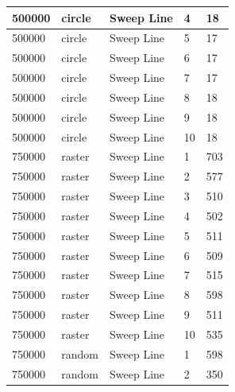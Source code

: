 \documentclass[12pt]{article}
\begin{document}
\begin{longtable}{|l|l|l|l|l|}
500000       & circle            & Sweep Line & 4          & 18                            \\ \hline
500000       & circle            & Sweep Line & 5          & 17                            \\ \hline
500000       & circle            & Sweep Line & 6          & 17                            \\ \hline
500000       & circle            & Sweep Line & 7          & 17                            \\ \hline
500000       & circle            & Sweep Line & 8          & 18                            \\ \hline
500000       & circle            & Sweep Line & 9          & 18                            \\ \hline
500000       & circle            & Sweep Line & 10         & 18                            \\ \hline
750000       & raster            & Sweep Line & 1          & 703                           \\ \hline
750000       & raster            & Sweep Line & 2          & 577                           \\ \hline
750000       & raster            & Sweep Line & 3          & 510                           \\ \hline
750000       & raster            & Sweep Line & 4          & 502                           \\ \hline
750000       & raster            & Sweep Line & 5          & 511                           \\ \hline
750000       & raster            & Sweep Line & 6          & 509                           \\ \hline
750000       & raster            & Sweep Line & 7          & 515                           \\ \hline
750000       & raster            & Sweep Line & 8          & 598                           \\ \hline
750000       & raster            & Sweep Line & 9          & 511                           \\ \hline
750000       & raster            & Sweep Line & 10         & 535                           \\ \hline
750000       & random            & Sweep Line & 1          & 598                           \\ \hline
750000       & random            & Sweep Line & 2          & 350                           \\ \hline

\end{longtable}
\end{document}
